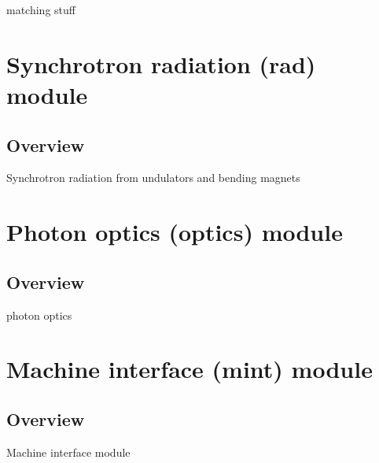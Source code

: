 \documentclass[letterpaper,10pt,english]{sphinxmanual}
\begin{document}
\begin{fulllineitems}
\label{cpbd:ocelot.cpbd.optics.twiss}
\end{fulllineitems}


\begin{fulllineitems}
\label{cpbd:ocelot.cpbd.match.match}
matching stuff

\end{fulllineitems}



\section{Synchrotron radiation (rad) module}
\label{radiation:synchrotron-radiation-rad-module}\label{radiation::doc}

\subsection{Overview}
\label{radiation:overview}
Synchrotron radiation from undulators and bending magnets


\section{Photon optics (optics) module}
\label{optics::doc}\label{optics:photon-optics-optics-module}

\subsection{Overview}
\label{optics:overview}
photon optics


\section{Machine interface (mint) module}
\label{mint::doc}\label{mint:machine-interface-mint-module}

\subsection{Overview}
\label{mint:overview}
Machine interface module
\end{document}
